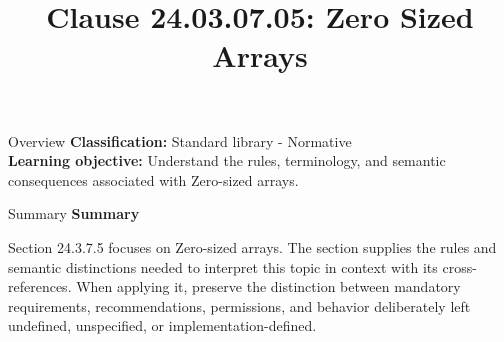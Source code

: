 \documentclass[10pt,letterpaper]{article}
\title{Clause 24.03.07.05: Zero Sized Arrays}
\author{}
\date{}
\begin{document}
\maketitle
\begin{CornellOverviewBox}{Overview}
\textbf{Classification:} Standard library - Normative\\[2pt]
\textbf{Learning objective:} Understand the rules, terminology, and semantic consequences associated with Zero-sized arrays.
\end{CornellOverviewBox}\begin{CornellSummaryBox}{Summary}
{\sffamily\bfseries\color{Accent} Summary}\par\vspace{3pt}Section 24.3.7.5 focuses on Zero-sized arrays. The section supplies the rules and semantic distinctions needed to interpret this topic in context with its cross-references. When applying it, preserve the distinction between mandatory requirements, recommendations, permissions, and behavior deliberately left undefined, unspecified, or implementation-defined.
\end{CornellSummaryBox}
\end{document}
